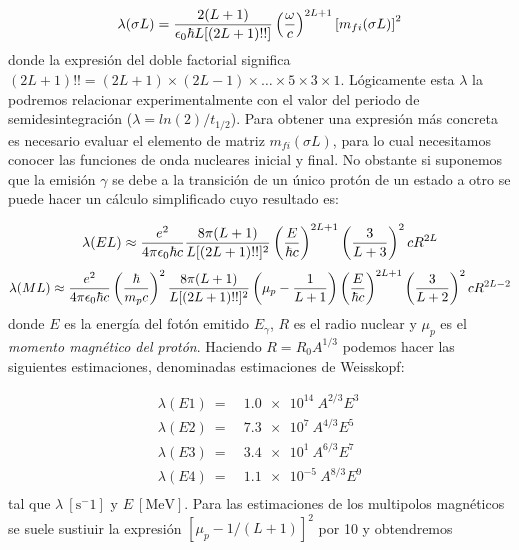 \begin{equation}
	\lambda (\sigma L) = \frac{2(L+1)}{\epsilon_0 \hbar L [(2L+1)!!]} \left( \frac{\omega}{c} \right)^{2L+1} \left[ m_{fi}(\sigma L) \right]^2
\end{equation}
donde la expresión del doble factorial significa $(2L+1)!!=(2L+1)\times(2L-1) \times \ldots \times 5 \times 3 \times 1$. Lógicamente esta $\lambda$ la podremos relacionar experimentalmente con el valor del periodo de semidesintegración ($\lambda=ln(2)/t_{1/2}$). Para obtener una expresión más concreta es necesario evaluar el elemento de matriz $m_{fi}(\sigma L)$, para lo cual necesitamos conocer las funciones de onda nucleares inicial y final. No obstante si suponemos que la emisión $\gamma$ se debe a la transición de un único protón de un estado a otro se puede hacer un cálculo simplificado cuyo resultado es:

\begin{equation}	
	\lambda(EL) \approx \frac{e^2}{4\pi\epsilon_0 \hbar c} \frac{8\pi (L+1)}{L[(2L+1)!!]^2} \left( \frac{E}{\hbar c} \right)^{2L+1} \left( \frac{3}{L+3} \right)^2 cR^{2L}
\end{equation}
\begin{equation}	
	\lambda(ML) \approx \frac{e^2}{4\pi\epsilon_0 \hbar c} \left( \frac{\hbar}{m_pc} \right)^2 \frac{8\pi (L+1)}{L[(2L+1)!!]^2} \left( \mu_p - \frac{1}{L+1} \right) \left( \frac{E}{\hbar c} \right)^{2L+1} \left( \frac{3}{L+2} \right)^2 cR^{2L-2}
\end{equation}
donde $E$ es la energía del fotón emitido $E_\gamma$, $R$ es el radio nuclear y $\mu_p$ es el \textit{momento magnético del protón}. Haciendo $R=R_0 A^{1/3}$ podemos hacer las siguientes estimaciones, denominadas estimaciones de Weisskopf:

\begin{equation}
	\begin{split}
	\lambda (E1) \ = \ & \unit{\num{1.0e14} \ A^{2/3}E^3} \\
	\lambda (E2) \ = \ & \unit{\num{7.3e7} \ A^{4/3}E^5} \\
	\lambda (E3) \ = \ & \unit{\num{3.4e1} \ A^{6/3}E^7} \\
	\lambda (E4) \ = \ & \unit{\num{1.1e-5} \ A^{8/3}E^9} \\
	\end{split}
\end{equation}
tal que $\lambda \ [\unit{\s^-1}]$ y $E \ [\unit{\MeV}]$. Para las estimaciones de los multipolos magnéticos se suele sustiuir la expresión $[\mu_p-1/(L+1)]^2$ por 10 y obtendremos


